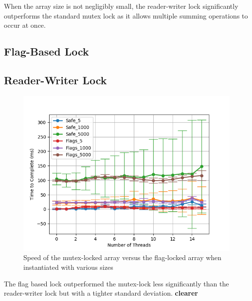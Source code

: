 \documentclass[11pt]{article}
\newcommand{\todo}[1]{\textbf{#1}}
\begin{document}
When the array size is not negligibly small, the reader-writer lock significantly outperforms the standard mutex lock as it allows multiple summing operations to occur at once.

\subsection{Flag-Based Lock}

\subsection{Reader-Writer Lock}
\begin{figure}\label{step6_1}
\centering
\includegraphics[scale=0.65]{step6_1.png}
\caption{Speed of the mutex-locked array versus the flag-locked array when instantiated with various sizes}
\end{figure}

The flag based lock outperformed the mutex-lock less significantly than the reader-writer lock but with a tighter standard deviation. \todo{clearer}
\end{document}

